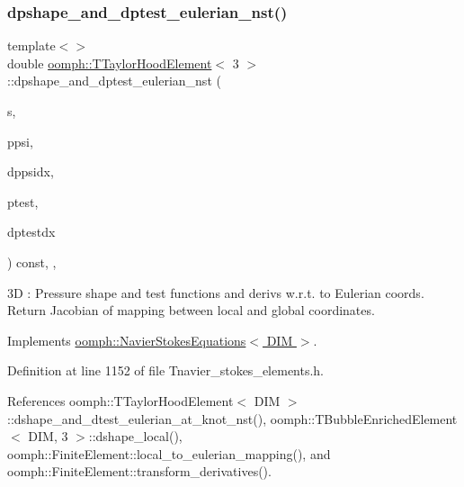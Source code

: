 \subsubsection{\texorpdfstring{dpshape\+\_\+and\+\_\+dptest\+\_\+eulerian\+\_\+nst()}{dpshape\_and\_dptest\_eulerian\_nst()}\hspace{0.1cm}{\footnotesize\ttfamily [3/3]}}
{\footnotesize\ttfamily template$<$$>$ \\
double \hyperlink{classoomph_1_1TTaylorHoodElement}{oomph\+::\+T\+Taylor\+Hood\+Element}$<$ 3 $>$\+::dpshape\+\_\+and\+\_\+dptest\+\_\+eulerian\+\_\+nst (\begin{DoxyParamCaption}\item[{const \hyperlink{classoomph_1_1Vector}{Vector}$<$ double $>$ \&}]{s,  }\item[{\hyperlink{classoomph_1_1Shape}{Shape} \&}]{ppsi,  }\item[{\hyperlink{classoomph_1_1DShape}{D\+Shape} \&}]{dppsidx,  }\item[{\hyperlink{classoomph_1_1Shape}{Shape} \&}]{ptest,  }\item[{\hyperlink{classoomph_1_1DShape}{D\+Shape} \&}]{dptestdx }\end{DoxyParamCaption}) const\hspace{0.3cm}{\ttfamily [inline]}, {\ttfamily [protected]}, {\ttfamily [virtual]}}

3D \+: Pressure shape and test functions and derivs w.\+r.\+t. to Eulerian coords. Return Jacobian of mapping between local and global coordinates. 

Implements \hyperlink{classoomph_1_1NavierStokesEquations_a2f3024a4d370ec45ddffacb236bc2bb2}{oomph\+::\+Navier\+Stokes\+Equations$<$ D\+I\+M $>$}.



Definition at line 1152 of file Tnavier\+\_\+stokes\+\_\+elements.\+h.



References oomph\+::\+T\+Taylor\+Hood\+Element$<$ D\+I\+M $>$\+::dshape\+\_\+and\+\_\+dtest\+\_\+eulerian\+\_\+at\+\_\+knot\+\_\+nst(), oomph\+::\+T\+Bubble\+Enriched\+Element$<$ D\+I\+M, 3 $>$\+::dshape\+\_\+local(), oomph\+::\+Finite\+Element\+::local\+\_\+to\+\_\+eulerian\+\_\+mapping(), and oomph\+::\+Finite\+Element\+::transform\+\_\+derivatives().

\mbox{\label{classoomph_1_1TTaylorHoodElement_a2e400e85a0fa2da44846f2a9d46c7066}} 
